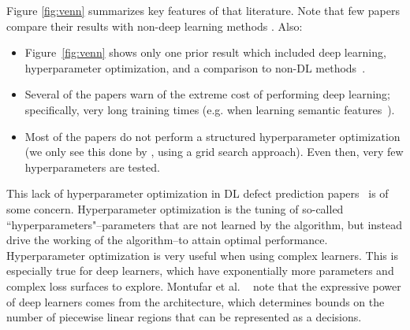 \documentclass[10pt,compsoc,twocolumn]{IEEEtran}
\begin{document}
 
 Figure \ref{fig:venn} summarizes key features of that literature. 
 Note that few papers compare their results with non-deep learning methods \cite{wang2016automatically,dam2019lessons}. Also:
\begin{itemize}
\item 
Figure~\ref{fig:venn} shows only one prior
result which included deep learning, hyperparameter optimization, and a comparison to non-DL methods~\cite{wang2016automatically}. 
\item
Several of the papers warn of the extreme   cost of performing deep learning; specifically, very long training times 
(e.g. when learning semantic features~\cite{wang2016automatically}).


\item
Most of the papers do not perform a structured hyperparameter optimization (we only see this done by \cite{wang2016automatically}, using a grid search approach). Even then, very few hyperparameters are tested.
 \end{itemize}
 This lack of hyperparameter optimization in DL defect prediction  papers~\cite{wang2016automatically,dam2019lessons, wang2018deep}
is of some concern.
Hyperparameter optimization is the tuning of so-called ``hyperparameters"--parameters that are not learned by the algorithm, but instead drive the working of the algorithm--to attain optimal performance.  
Hyperparameter optimization is very useful when using complex   learners.
This is especially true for deep learners, which have exponentially more parameters and complex loss surfaces to explore. Montufar et al. ~\cite{montufar2014number} note that the expressive power of deep learners comes from the architecture, which determines bounds on the number of piecewise linear regions that can be represented as a decisions.
\end{document}
